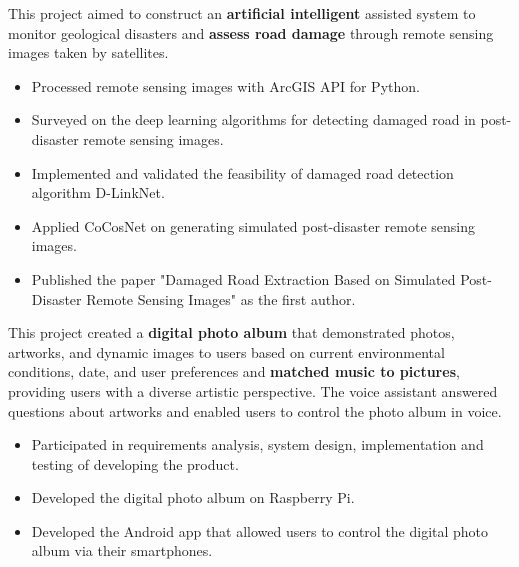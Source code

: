 \documentclass{resume}
\begin{document}
This project aimed to construct an \textbf{artificial intelligent} assisted system to monitor geological disasters and \textbf{assess road damage} through remote sensing images taken by satellites. 
\begin{itemize}
  \item Processed remote sensing images with ArcGIS API for Python.
  \item Surveyed on the deep learning algorithms for detecting damaged road in post-disaster remote sensing images.
  \item Implemented and validated the feasibility of damaged road detection algorithm D-LinkNet.
  \item Applied CoCosNet on generating simulated post-disaster remote sensing images.
  \item Published the paper "Damaged Road Extraction Based on Simulated Post-Disaster Remote Sensing Images" as the first author.
\end{itemize}

This project created a \textbf{digital photo album} that demonstrated photos, artworks, and dynamic images to users based on current environmental conditions, date, and user preferences and \textbf{matched music to pictures}, providing users with a diverse artistic perspective. The voice assistant answered questions about artworks and enabled users to control the photo album in voice.
\begin{itemize}
  \item Participated in requirements analysis, system design, implementation and testing of developing the product.
  \item Developed the digital photo album on Raspberry Pi.
  \item Developed the Android app that allowed users to control the digital photo album via their smartphones.
\end{itemize}
\end{document}
